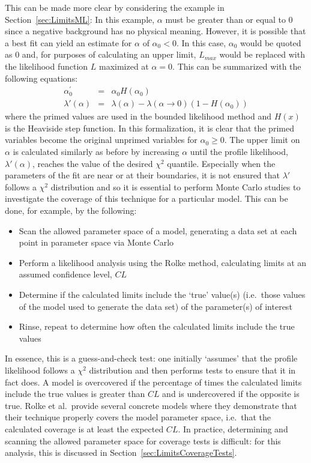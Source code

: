 This can be made more clear by considering the example in Section~\ref{sec:LimitsML}:  In this example, $\alpha$ must be greater than or equal to 0 since a negative background has no physical meaning.  However, it is possible that a best fit can yield an estimate for $\alpha$ of $\alpha_{0}<0$.  In this case, $\alpha_{0}$ would be quoted as 0 and, for purposes of calculating an upper limit, $L_{max}$ would be replaced with the likelihood function $L$ maximized at $\alpha = 0$.  This can be summarized with the following equations:
		\begin{equation}
			\begin{array}{rcl}
				\alpha_0^{\prime} & = & \alpha_0 H (\alpha_0) \\
				\lambda' (\alpha) & = & \lambda(\alpha) - \lambda(\alpha \to 0) (1 - H(\alpha_0))
			\end{array}
		\end{equation}
where the primed values are used in the bounded likelihood method and $H(x)$ is the Heaviside step function.  In this formalization, it is clear that the primed variables become the original unprimed variables for $\alpha_{0}\geq0$.  The upper limit on $\alpha$ is calculated similarly as before by increasing $\alpha$ until the profile likelihood, $\lambda'(\alpha)$, reaches the value of the desired $\chi^{2}$ quantile.  Especially when the parameters of the fit are near or at their boundaries, it is not ensured that $\lambda'$ follows a $\chi^{2}$ distribution and so it is essential to perform Monte Carlo studies to investigate the coverage of this technique for a particular model.  This can be done, for example, by the following:
		\begin{itemize}
			\item Scan the allowed parameter space of a model, 
			generating a data set at each point in parameter space via Monte Carlo
			\item Perform a likelihood analysis using the Rolke method, calculating limits at an 
			assumed confidence level, $CL$
			\item Determine if the calculated limits include the `true' value(s) (i.e.~those values of 
			the model used to generate the data set) of the parameter(s) of interest 
			\item Rinse, repeat to determine how often the calculated limits include the true values
		\end{itemize}			
In essence, this is a guess-and-check test: one initially `assumes' that the profile likelihood follows a $\chi^{2}$ distribution and then performs tests to ensure that it in fact does.  A model is overcovered if the percentage of times the calculated limits include the true values is greater than $CL$ and is undercovered if the opposite is true.  Rolke et al.~provide several concrete models where they demonstrate that their technique properly covers the model parameter space, i.e.~that the calculated coverage is at least the expected $CL$.  In practice, determining and scanning the allowed parameter space for coverage tests is difficult: for this analysis, this is discussed in Section~\ref{sec:LimitsCoverageTests}.

